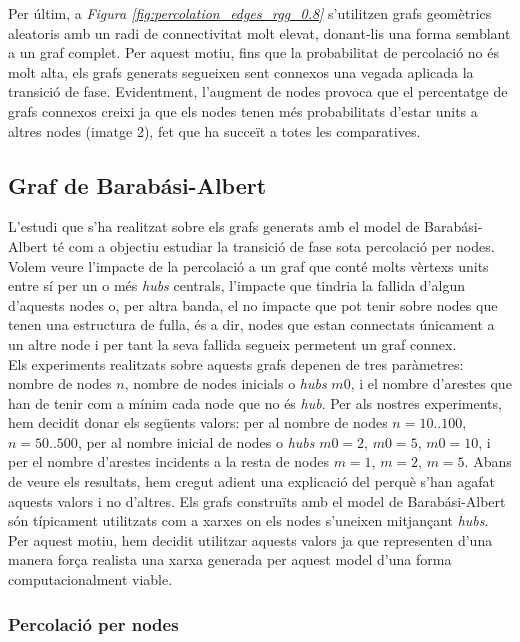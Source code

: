 \documentclass[a4paper]{article}
\begin{document}
	Per últim, a \textit{Figura \ref{fig:percolation_edges_rgg_0.8}} s'utilitzen grafs geomètrics aleatoris amb un radi de connectivitat molt elevat, donant-lis una forma semblant a un graf complet. Per aquest motiu, fins que la probabilitat de percolació no és molt alta, els grafs generats segueixen sent connexos una vegada aplicada la transició de fase. Evidentment, l'augment de nodes provoca que el percentatge de grafs connexos creixi ja que els nodes tenen més probabilitats d'estar units a altres nodes (imatge 2), fet que ha succeït a totes les comparatives.
	
	\subsection{Graf de Barabási-Albert}
	
	L'estudi que s'ha realitzat sobre els grafs generats amb el model de Barabási-Albert té com a objectiu estudiar la transició de fase sota percolació per nodes. Volem veure l'impacte de la percolació a un graf que conté molts vèrtexs units entre sí per un o més \textit{hubs} centrals, l'impacte que tindria la fallida d'algun d'aquests nodes o, per altra banda, el no impacte que pot tenir sobre nodes que tenen una estructura de fulla, és a dir, nodes que estan connectats únicament a un altre node i per tant la seva fallida segueix permetent un graf connex. \\
	
	Els experiments realitzats sobre aquests grafs depenen de tres paràmetres: nombre de nodes $n$, nombre de nodes inicials o \textit{hubs} $m0$, i el nombre d'arestes que han de tenir com a mínim cada node que no és \textit{hub}. Per als nostres experiments, hem decidit donar els següents valors: per al nombre de nodes $n = 10..100$, $n = 50..500$, per al nombre inicial de nodes o \textit{hubs} $m0 = 2$, $m0 = 5$, $m0 = 10$, i per el nombre d'arestes incidents a la resta de nodes $m = 1$, $m = 2$, $m = 5$. Abans de veure els resultats, hem cregut adient una explicació del perquè s'han agafat aquests valors i no d'altres. Els grafs construïts amb el model de Barabási-Albert són típicament utilitzats com a xarxes on els nodes s'uneixen mitjançant \textit{hubs}. Per aquest motiu, hem decidit utilitzar aquests valors ja que representen d'una manera força realista una xarxa generada per aquest model d'una forma computacionalment viable.
	
	\subsubsection{Percolació per nodes}
	
\end{document}
